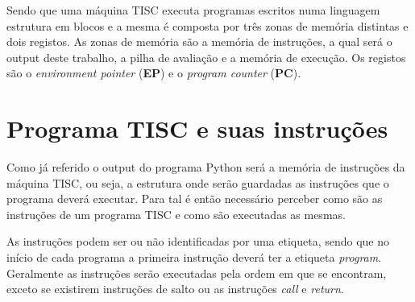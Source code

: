 \documentclass[titlepage,11pt,svgnames]{article}   %
\begin{document}
Sendo que uma máquina TISC executa programas escritos numa linguagem estrutura em blocos e a mesma é composta por três zonas de memória distintas e dois registos. As zonas de memória são a memória de instruções, a qual será o output deste trabalho, a pilha de avaliação e a memória de execução. Os registos são o \textit{environment pointer} (\textbf{EP}) e o \textit{program counter} (\textbf{PC}).
\pagebreak


\section{Programa TISC e suas instruções}
\label{sec:desc_prob}

Como já referido o output do programa Python será a memória de instruções da máquina TISC, ou seja, a estrutura onde serão guardadas as instruções que o programa deverá executar. Para tal é então necessário perceber como são as instruções de um programa TISC e como são executadas as mesmas.

As instruções podem ser ou não identificadas por uma etiqueta, sendo que no início de cada programa a primeira instrução deverá ter a etiqueta \textit{program}. Geralmente as instruções serão executadas pela ordem em que se encontram, exceto se existirem instruções de salto ou as instruções \textit{call} e \textit{return}.
\end{document}

